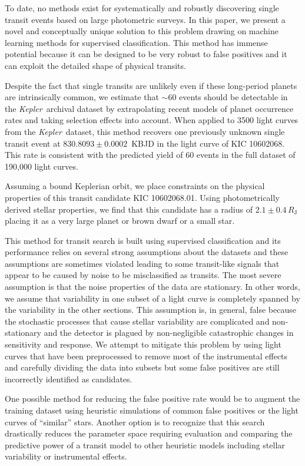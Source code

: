 \documentclass[manuscript, letterpaper]{aastex6}
\newcommand{\project}[1]{\textsl{#1}}
\newcommand{\kepler}{\project{Kepler}}
\newcommand{\paper}{paper}
\begin{document}
To date, no methods exist for systematically and robustly discovering single
transit events based on large photometric surveys.
In this \paper, we present a novel and conceptually unique solution to this
problem drawing on machine learning methods for supervised classification.
This method has immense potential because it can be designed to be very robust
to false positives and it can exploit the detailed shape of physical transits.

Despite the fact that single transits are unlikely even if these long-period
planets are intrinsically common, we estimate that $\sim 60$ events should be
detectable in the \kepler\ archival dataset by extrapolating recent models of
planet occurrence rates and taking selection effects into account.
When applied to 3500 light curves from the \kepler\ dataset, this method
recovers one previously unknown single transit event at
$830.8093\pm0.0002$~KBJD in the light curve of KIC 10602068.
This rate is consistent with the predicted yield of 60 events in the full
dataset of 190,000 light curves.

Assuming a bound Keplerian orbit, we place constraints on the physical
properties of this transit candidate KIC 10602068.01.
Using photometrically derived stellar properties, we find that this candidate
has a radius of $2.1 \pm 0.4\,R_\mathrm{J}$ placing it as a very large planet
or brown dwarf or a small star.

This method for transit search is built using supervised classification and
its performance relies on several strong assumptions about the datasets and
these assumptions are sometimes violated leading to some transit-like signals
that appear to be caused by noise to be misclassified as transits.
The most severe assumption is that the noise properties of the data are
stationary.
In other words, we assume that variability in one subset of a light curve is
completely spanned by the variability in the other sections.
This assumption is, in general, false because the stochastic processes that
cause stellar variability are complicated and non-stationary and the detector
is plagued by non-negligible catastrophic changes in sensitivity and response.
We attempt to mitigate this problem by using light curves that have been
preprocessed to remove most of the instrumental effects and carefully dividing
the data into subsets but some false positives are still incorrectly
identified as candidates.

One possible method for reducing the false positive rate would be to augment
the training dataset using heuristic simulations of common false positives or
the light curves of ``similar'' stars.
Another option is to recognize that this search drastically reduces the
parameter space requiring evaluation and comparing the predictive power of
a transit model to other heuristic models including stellar variability or
instrumental effects.
\end{document}
